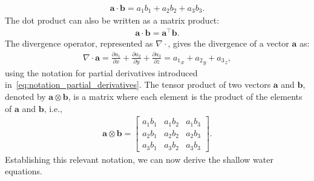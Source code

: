 \begin{align*}
    \mathbf{a} \cdot \mathbf{b} = a_1 b_1 + a_2 b_2 + a_3 b_3.
\end{align*}
The dot product can also be written as a matrix product:
\begin{align*}
    \mathbf{a} \cdot \mathbf{b} = \mathbf{a}^\top \mathbf{b}.
\end{align*}
The divergence operator, represented as $\nabla \cdot $, gives the divergence of a vector $\mathbf{a}$ as:
\begin{align*}
    \nabla \cdot \mathbf{a} = \frac{\partial a_1}{\partial x} + \frac{\partial a_2}{\partial y} + \frac{\partial a_3}{\partial z} = {a_1}_x + {a_2}_y + {a_3}_z,
\end{align*}
using the notation for partial derivatives introduced in~\eqref{eq:notation_partial_derivatives}.
The tensor product of two vectors $\mathbf{a}$ and $\mathbf{b}$, denoted by $\mathbf{a} \otimes \mathbf{b}$, is a matrix where each element is the product of the elements of $\mathbf{a}$ and $\mathbf{b}$, i.e.,
\begin{align*}
    \mathbf{a} \otimes \mathbf{b} = \begin{bmatrix}
        a_1 b_1 & a_1 b_2 & a_1 b_3 \\
        a_2 b_1 & a_2 b_2 & a_2 b_3 \\
        a_3 b_1 & a_3 b_2 & a_3 b_3
\end{bmatrix}.
\end{align*}
Establishing this relevant notation, we can now derive the shallow water equations.



 
